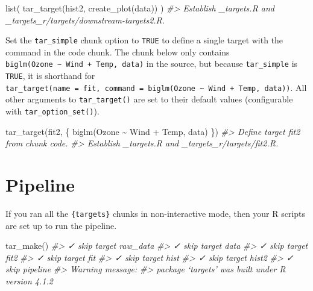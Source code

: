 \documentclass[
]{book}
\newenvironment{Shaded}{\begin{snugshade}}{\end{snugshade}}
\newcommand{\CommentTok}[1]{\textcolor[rgb]{0.56,0.35,0.01}{\textit{#1}}}
\newcommand{\FunctionTok}[1]{\textcolor[rgb]{0.00,0.00,0.00}{#1}}
\newcommand{\NormalTok}[1]{#1}
\newcommand{\SpecialCharTok}[1]{\textcolor[rgb]{0.00,0.00,0.00}{#1}}
\begin{document}
\begin{Shaded}
\begin{Highlighting}[]
\FunctionTok{list}\NormalTok{(}
  \FunctionTok{tar\_target}\NormalTok{(hist2, }\FunctionTok{create\_plot}\NormalTok{(data))}
\NormalTok{)}
\CommentTok{\#\textgreater{} Establish \_targets.R and \_targets\_r/targets/downstream{-}targets2.R.}
\end{Highlighting}
\end{Shaded}

Set the \texttt{tar\_simple} chunk option to \texttt{TRUE} to define a single target with the command in the code chunk. The chunk below only contains \texttt{biglm(Ozone\ \textasciitilde{}\ Wind\ +\ Temp,\ data)} in the source, but because \texttt{tar\_simple} is \texttt{TRUE}, it is shorthand for \texttt{tar\_target(name\ =\ fit,\ command\ =\ biglm(Ozone\ \textasciitilde{}\ Wind\ +\ Temp,\ data))}. All other arguments to \texttt{tar\_target()} are set to their default values (configurable with \texttt{tar\_option\_set()}).

\begin{Shaded}
\begin{Highlighting}[]
\FunctionTok{tar\_target}\NormalTok{(fit2, \{}
  \FunctionTok{biglm}\NormalTok{(Ozone }\SpecialCharTok{\textasciitilde{}}\NormalTok{ Wind }\SpecialCharTok{+}\NormalTok{ Temp, data)}
\NormalTok{\})}
\CommentTok{\#\textgreater{} Define target fit2 from chunk code.}
\CommentTok{\#\textgreater{} Establish \_targets.R and \_targets\_r/targets/fit2.R.}
\end{Highlighting}
\end{Shaded}

\hypertarget{pipeline-1}{%
\section{Pipeline}\label{pipeline-1}}

If you ran all the \texttt{\{targets\}} chunks in non-interactive mode, then your R scripts are set up to run the pipeline.

\begin{Shaded}
\begin{Highlighting}[]
\FunctionTok{tar\_make}\NormalTok{()}
\CommentTok{\#\textgreater{} ✓ skip target raw\_data}
\CommentTok{\#\textgreater{} ✓ skip target data}
\CommentTok{\#\textgreater{} ✓ skip target fit2}
\CommentTok{\#\textgreater{} ✓ skip target fit}
\CommentTok{\#\textgreater{} ✓ skip target hist}
\CommentTok{\#\textgreater{} ✓ skip target hist2}
\CommentTok{\#\textgreater{} ✓ skip pipeline}
\CommentTok{\#\textgreater{} Warning message:}
\CommentTok{\#\textgreater{} package ‘targets’ was built under R version 4.1.2}
\end{Highlighting}
\end{Shaded}
\end{document}
